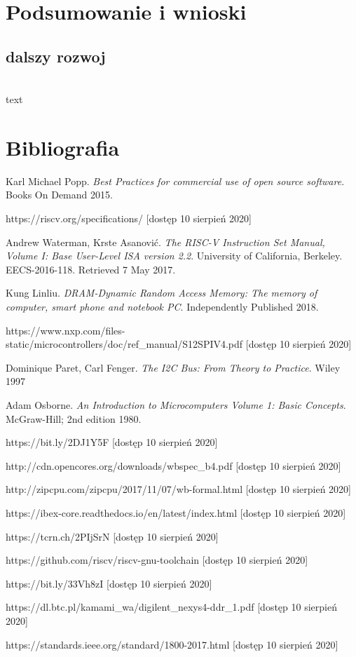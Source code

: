 \documentclass[11pt,a4paper]{article}
\begin{document}
\newpage
\section{Podsumowanie i wnioski}
	\subsection{dalszy rozwoj}
	\hspace{5mm}
		\\text

\newpage
\section{Bibliografia}

\begin{thebibliography}{10}

	 Karl Michael Popp. \textit{Best Practices for commercial use of open source software}. Books On Demand  2015.
	
	 https://riscv.org/specifications/ [dostęp 10 sierpień 2020]
	
	 Andrew Waterman, Krste Asanović. \textit{The RISC-V Instruction Set Manual, Volume I: Base User-Level ISA version 2.2}. University of California, Berkeley. EECS-2016-118. Retrieved 7 May 2017.
	
	 Kung Linliu. \textit{DRAM-Dynamic Random Access Memory: The memory of computer, smart phone and notebook PC}. Independently Published 2018.
	
	 https://www.nxp.com/files-static/microcontrollers/doc/ref\_manual/S12SPIV4.pdf [dostęp 10 sierpień 2020]
	
	 	Dominique Paret, Carl Fenger. \textit{The I2C Bus: From Theory to Practice}. Wiley 1997 
	
	 Adam Osborne. \textit{An Introduction to Microcomputers Volume 1: Basic Concepts}. McGraw-Hill; 2nd edition 1980.
	
	 https://bit.ly/2DJ1Y5F [dostęp 10 sierpień 2020]
	
	 http://cdn.opencores.org/downloads/wbspec\_b4.pdf [dostęp 10 sierpień 2020]
	
	 http://zipcpu.com/zipcpu/2017/11/07/wb-formal.html [dostęp 10 sierpień 2020]
	
	 https://ibex-core.readthedocs.io/en/latest/index.html [dostęp 10 sierpień 2020]
	
	 https://tcrn.ch/2PIjSrN [dostęp 10 sierpień 2020]

	 https://github.com/riscv/riscv-gnu-toolchain [dostęp 10 sierpień 2020]
	
	 https://bit.ly/33Vh8zI [dostęp 10 sierpień 2020]
	
	 https://dl.btc.pl/kamami\_wa/digilent\_nexys4-ddr\_1.pdf [dostęp 10 sierpień 2020]
	
	 https://standards.ieee.org/standard/1800-2017.html [dostęp 10 sierpień 2020]

\end{thebibliography}
\end{document}
